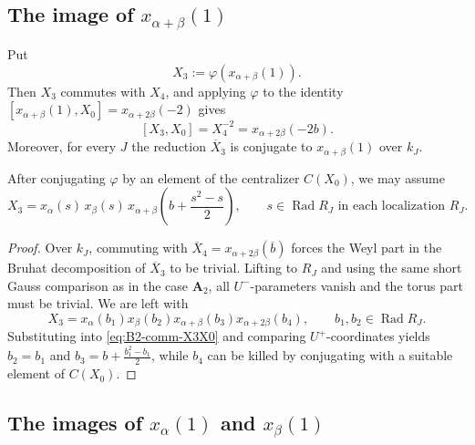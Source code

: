 \documentclass[]{jgcc}
\DeclareMathOperator{\Rad}{Rad}
\numberwithin{equation}{section}
\begin{document}
\subsection{\texorpdfstring{The image of $x_{\alpha+\beta}(1)$}{The image of xalpha+beta(1)}}

Put
\[
X_3:=\varphi(x_{\alpha+\beta}(1)).
\]
Then $X_3$ commutes with $X_4$, and applying $\varphi$ to the identity
$[x_{\alpha+\beta}(1),X_0]=x_{\alpha+2\beta}(-2)$ gives
\begin{equation}\label{eq:B2-comm-X3X0}
[X_3,X_0]=X_4^{-2}=x_{\alpha+2\beta}(-2b).
\end{equation}
Moreover, for every $J$ the reduction $\overline X_3$ is conjugate to $x_{\alpha+\beta}(1)$ over $k_J$.

\begin{prop}\label{prop:B2-X3}
After conjugating $\varphi$ by an element of the centralizer $C(X_0)$, we may assume
\begin{equation}\label{eq:B2-X3-form}
X_3=
x_\alpha(s)\,x_\beta(s)\,x_{\alpha+\beta}\!\left(b+\frac{s^2-s}{2}\right),
\qquad s\in\Rad R_J \text{ in each localization }R_J.
\end{equation}
\end{prop}

\begin{proof}
Over $k_J$, commuting with $\overline X_4=x_{\alpha+2\beta}(\overline b)$ forces the Weyl part in the Bruhat decomposition of $\overline X_3$
to be trivial.
Lifting to $R_J$ and using the same short Gauss comparison as in the case $\mathbf A_2$, all $U^-$-parameters vanish and the torus part must be trivial.
We are left with
\[
X_3=x_\alpha(b_1)x_\beta(b_2)x_{\alpha+\beta}(b_3)x_{\alpha+2\beta}(b_4),
\qquad b_1,b_2\in\Rad R_J.
\]
Substituting into \eqref{eq:B2-comm-X3X0} and comparing $U^+$-coordinates yields $b_2=b_1$ and
$b_3=b+\frac{b_1^2-b_1}{2}$, while $b_4$ can be killed by conjugating with a suitable element of $C(X_0)$.
\end{proof}

\subsection{\texorpdfstring{The images of $x_\alpha(1)$ and $x_\beta(1)$}{The images of xalpha(1) and xbeta(1)}}
\end{document}
